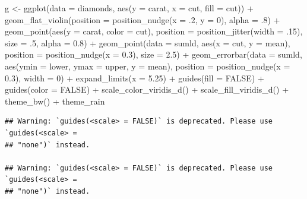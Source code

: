 \documentclass[
]{article}
\newenvironment{Shaded}{\begin{snugshade}}{\end{snugshade}}
\newcommand{\AttributeTok}[1]{\textcolor[rgb]{0.77,0.63,0.00}{#1}}
\newcommand{\ConstantTok}[1]{\textcolor[rgb]{0.00,0.00,0.00}{#1}}
\newcommand{\DecValTok}[1]{\textcolor[rgb]{0.00,0.00,0.81}{#1}}
\newcommand{\FloatTok}[1]{\textcolor[rgb]{0.00,0.00,0.81}{#1}}
\newcommand{\FunctionTok}[1]{\textcolor[rgb]{0.00,0.00,0.00}{#1}}
\newcommand{\NormalTok}[1]{#1}
\newcommand{\OtherTok}[1]{\textcolor[rgb]{0.56,0.35,0.01}{#1}}
\newcommand{\SpecialCharTok}[1]{\textcolor[rgb]{0.00,0.00,0.00}{#1}}
\begin{document}
\begin{Shaded}
\begin{Highlighting}[]
\NormalTok{g }\OtherTok{\textless{}{-}} \FunctionTok{ggplot}\NormalTok{(}\AttributeTok{data =}\NormalTok{ diamonds, }\FunctionTok{aes}\NormalTok{(}\AttributeTok{y =}\NormalTok{ carat, }\AttributeTok{x =}\NormalTok{ cut, }\AttributeTok{fill =}\NormalTok{ cut)) }\SpecialCharTok{+}
\FunctionTok{geom\_flat\_violin}\NormalTok{(}\AttributeTok{position =} \FunctionTok{position\_nudge}\NormalTok{(}\AttributeTok{x =}\NormalTok{ .}\DecValTok{2}\NormalTok{, }\AttributeTok{y =} \DecValTok{0}\NormalTok{), }\AttributeTok{alpha =}\NormalTok{ .}\DecValTok{8}\NormalTok{) }\SpecialCharTok{+}
\FunctionTok{geom\_point}\NormalTok{(}\FunctionTok{aes}\NormalTok{(}\AttributeTok{y =}\NormalTok{ carat, }\AttributeTok{color =}\NormalTok{ cut), }\AttributeTok{position =} \FunctionTok{position\_jitter}\NormalTok{(}\AttributeTok{width =}\NormalTok{ .}\DecValTok{15}\NormalTok{), }\AttributeTok{size =}\NormalTok{ .}\DecValTok{5}\NormalTok{, }\AttributeTok{alpha =} \FloatTok{0.8}\NormalTok{) }\SpecialCharTok{+}
\FunctionTok{geom\_point}\NormalTok{(}\AttributeTok{data =}\NormalTok{ sumld, }\FunctionTok{aes}\NormalTok{(}\AttributeTok{x =}\NormalTok{ cut, }\AttributeTok{y =}\NormalTok{ mean), }\AttributeTok{position =} \FunctionTok{position\_nudge}\NormalTok{(}\AttributeTok{x =} \FloatTok{0.3}\NormalTok{), }\AttributeTok{size =} \FloatTok{2.5}\NormalTok{) }\SpecialCharTok{+}
\FunctionTok{geom\_errorbar}\NormalTok{(}\AttributeTok{data =}\NormalTok{ sumld, }\FunctionTok{aes}\NormalTok{(}\AttributeTok{ymin =}\NormalTok{ lower, }\AttributeTok{ymax =}\NormalTok{ upper, }\AttributeTok{y =}\NormalTok{ mean), }\AttributeTok{position =} \FunctionTok{position\_nudge}\NormalTok{(}\AttributeTok{x =} \FloatTok{0.3}\NormalTok{), }\AttributeTok{width =} \DecValTok{0}\NormalTok{) }\SpecialCharTok{+}
\FunctionTok{expand\_limits}\NormalTok{(}\AttributeTok{x =} \FloatTok{5.25}\NormalTok{) }\SpecialCharTok{+}
\FunctionTok{guides}\NormalTok{(}\AttributeTok{fill =} \ConstantTok{FALSE}\NormalTok{) }\SpecialCharTok{+}
\FunctionTok{guides}\NormalTok{(}\AttributeTok{color =} \ConstantTok{FALSE}\NormalTok{) }\SpecialCharTok{+}
\FunctionTok{scale\_color\_viridis\_d}\NormalTok{() }\SpecialCharTok{+}
\FunctionTok{scale\_fill\_viridis\_d}\NormalTok{() }\SpecialCharTok{+}
\FunctionTok{theme\_bw}\NormalTok{() }\SpecialCharTok{+}
\NormalTok{theme\_rain}
\end{Highlighting}
\end{Shaded}

\begin{verbatim}
## Warning: `guides(<scale> = FALSE)` is deprecated. Please use `guides(<scale> =
## "none")` instead.

## Warning: `guides(<scale> = FALSE)` is deprecated. Please use `guides(<scale> =
## "none")` instead.
\end{verbatim}
\end{document}
